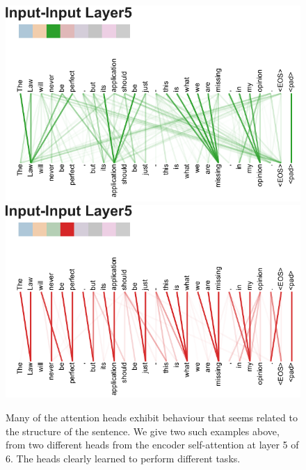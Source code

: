 \documentclass{article}
\begin{document}
\begin{figure}
{\includegraphics[width=\textwidth, trim=0 0 0 36, clip]{./vis/attending_to_head_new.pdf}}
{\includegraphics[width=\textwidth, trim=0 0 0 36, clip]{./vis/attending_to_head2_new.pdf}}
\caption{Many of the attention heads exhibit behaviour that seems related to the structure of the sentence. We give two such examples above, from two different heads from the encoder self-attention at layer 5 of 6. The heads clearly learned to perform different tasks.}
\end{figure}
 
\end{document}
